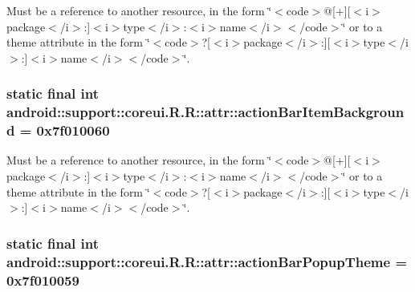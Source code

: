 Must be a reference to another resource, in the form \char`\"{}$<$code$>$@\mbox{[}+\mbox{]}\mbox{[}$<$i$>$package$<$/i$>$:\mbox{]}$<$i$>$type$<$/i$>$:$<$i$>$name$<$/i$>$$<$/code$>$\char`\"{} or to a theme attribute in the form \char`\"{}$<$code$>$?\mbox{[}$<$i$>$package$<$/i$>$:\mbox{]}\mbox{[}$<$i$>$type$<$/i$>$:\mbox{]}$<$i$>$name$<$/i$>$$<$/code$>$\char`\"{}. \hypertarget{classandroid_1_1support_1_1coreui_1_1_r_1_1attr_7f83fdf41f45b135638da4ea0512f35f}{
\subsubsection[{actionBarItemBackground}]{\setlength{\rightskip}{0pt plus 5cm}static final int android::support::coreui.R.R::attr::actionBarItemBackground = 0x7f010060}}
\label{classandroid_1_1support_1_1coreui_1_1_r_1_1attr_7f83fdf41f45b135638da4ea0512f35f}


Must be a reference to another resource, in the form \char`\"{}$<$code$>$@\mbox{[}+\mbox{]}\mbox{[}$<$i$>$package$<$/i$>$:\mbox{]}$<$i$>$type$<$/i$>$:$<$i$>$name$<$/i$>$$<$/code$>$\char`\"{} or to a theme attribute in the form \char`\"{}$<$code$>$?\mbox{[}$<$i$>$package$<$/i$>$:\mbox{]}\mbox{[}$<$i$>$type$<$/i$>$:\mbox{]}$<$i$>$name$<$/i$>$$<$/code$>$\char`\"{}. \hypertarget{classandroid_1_1support_1_1coreui_1_1_r_1_1attr_408d61dbd14f27806adbefa2a151c52a}{
\subsubsection[{actionBarPopupTheme}]{\setlength{\rightskip}{0pt plus 5cm}static final int android::support::coreui.R.R::attr::actionBarPopupTheme = 0x7f010059}}
\label{classandroid_1_1support_1_1coreui_1_1_r_1_1attr_408d61dbd14f27806adbefa2a151c52a}


